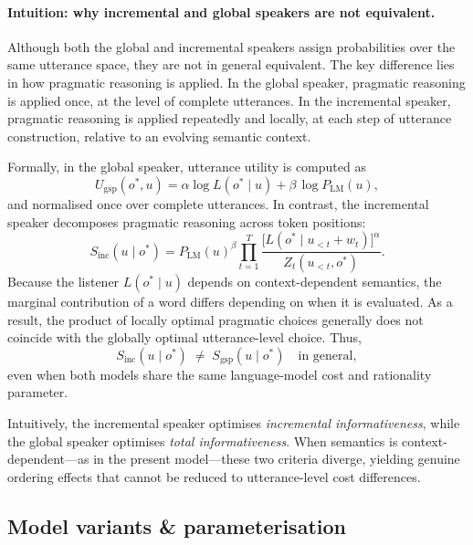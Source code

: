 \documentclass[11pt, a4paper]{article}
\begin{document}
\paragraph{Intuition: why incremental and global speakers are not equivalent.}
Although both the global and incremental speakers assign probabilities over the same utterance space, they are not in general equivalent.
The key difference lies in how pragmatic reasoning is applied.
In the global speaker, pragmatic reasoning is applied once, at the level of complete utterances.
In the incremental speaker, pragmatic reasoning is applied repeatedly and locally, at each step of utterance construction, relative to an evolving semantic context.

Formally, in the global speaker, utterance utility is computed as
\begin{equation}
  U_{\mathrm{gsp}}(o^\ast,u)
  = \alpha \log L(o^\ast \mid u) + \beta\,\log P_{\mathrm{LM}}(u),
  \label{eq:global_utility_compare}
\end{equation}
and normalised once over complete utterances.
In contrast, the incremental speaker decomposes pragmatic reasoning across token positions:
\begin{equation}
  S_{\mathrm{inc}}(u \mid o^\ast)
  = P_{\mathrm{LM}}(u)^{\beta}
  \prod_{t=1}^{T}
  \frac{\bigl[L(o^\ast \mid u_{<t} + w_t)\bigr]^{\alpha}}{Z_t(u_{<t}, o^\ast)}.
  \label{eq:inc_compare}
\end{equation}
Because the listener $L(o^\ast \mid u)$ depends on context-dependent semantics, the marginal contribution of a word differs depending on when it is evaluated.
As a result, the product of locally optimal pragmatic choices generally does not coincide with the globally optimal utterance-level choice.
Thus,
\begin{equation}
  S_{\mathrm{inc}}(u \mid o^\ast) \;\neq\; S_{\mathrm{gsp}}(u \mid o^\ast) \quad\text{in general},
  \label{eq:speaker_inequality}
\end{equation}
even when both models share the same language-model cost and rationality parameter.

Intuitively, the incremental speaker optimises \emph{incremental informativeness}, while the global speaker optimises \emph{total informativeness}.
When semantics is context-dependent---as in the present model---these two criteria diverge, yielding genuine ordering effects that cannot be reduced to utterance-level cost differences.

\subsection{Model variants \& parameterisation}
\label{sec:model:variants}
\end{document}
